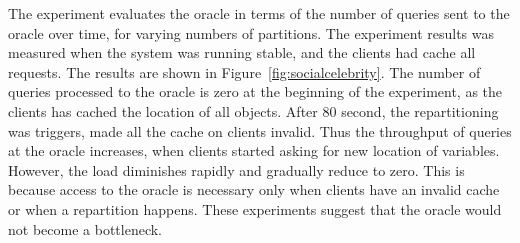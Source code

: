 
The experiment evaluates the oracle in terms of the number of queries sent to the oracle over
time, for varying numbers of partitions. The experiment results was measured when the system was running stable, 
and the clients had cache all requests.  The results are shown in
Figure~\ref{fig:socialcelebrity}. The number of queries processed to the oracle is zero at the 
beginning of the experiment, as the clients has cached the location of all objects.
After 80 second, the repartitioning was triggers, made all the cache on clients invalid.
Thus the throughput of queries at the oracle increases, when clients started asking for new location of variables.
However, the load diminishes rapidly and gradually reduce to zero. This is because access to the oracle is necessary only
when clients have an invalid cache or when a repartition happens. These experiments
suggest that the oracle would not become a bottleneck.%


